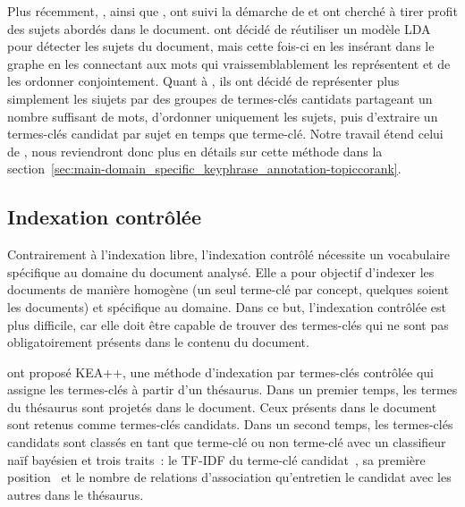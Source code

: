     Plus récemment, , ainsi que
    , ont suivi la démarche de
     et ont cherché à tirer profit des sujets
    abordés dans le document.  ont décidé
    de réutiliser un modèle LDA pour détecter les sujets du document, mais cette
    fois-ci en les insérant dans le graphe en les connectant aux mots qui
    vraissemblablement les représentent et de les ordonner conjointement. Quant
    à , ils ont décidé de représenter plus
    simplement les siujets par des groupes de termes-clés cantidats partageant
    un nombre suffisant de mots, d'ordonner uniquement les sujets, puis
    d'extraire un termes-clés candidat par sujet en temps que terme-clé. Notre
    travail étend celui de , nous reviendront
    donc plus en détails sur cette méthode dans la
    section~\ref{sec:main-domain_specific_keyphrase_annotation-topiccorank}.

  \subsection{Indexation contrôlée}
  \label{subsec:main-domain_specific_keyphrase_annotation-state_of_the_art-keyphrase_extraction}
    Contrairement à l'indexation libre, l'indexation contrôlé nécessite un
    vocabulaire spécifique au domaine du document analysé. Elle a pour objectif
    d'indexer les documents de manière homogène (un seul terme-clé par concept,
    quelques soient les documents) et spécifique au domaine. Dans ce but,
    l'indexation contrôlée est plus difficile, car elle doit être capable de
    trouver des termes-clés qui ne sont pas obligatoirement présents dans le
    contenu du document.

     ont proposé KEA++, une méthode d'indexation par
    termes-clés contrôlée qui assigne les termes-clés à partir d'un thésaurus.
    Dans un premier temps, les termes du thésaurus sont projetés dans le
    document. Ceux présents dans le document sont retenus comme termes-clés
    candidats. Dans un second temps, les termes-clés candidats sont classés en
    tant que \og{}terme-clé\fg{} ou \og{}non terme-clé\fg{} avec un classifieur
    naïf bayésien et trois traits~: le TF-IDF du terme-clé
    candidat~\cite{witten1999kea}, sa première position~\cite{witten1999kea} et
    le nombre de relations d'association qu'entretien le candidat avec les
    autres dans le thésaurus.

